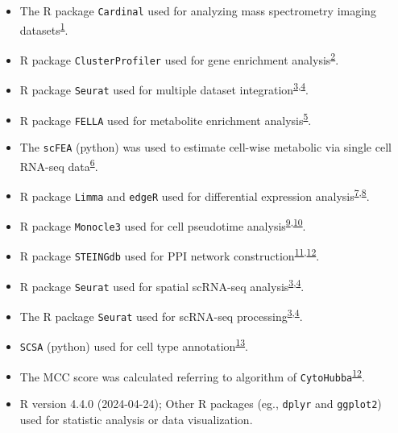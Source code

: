 \documentclass[
]{article}
\providecommand{\tightlist}{%
  \setlength{\itemsep}{0pt}\setlength{\parskip}{0pt}}
\begin{document}
\begin{itemize}
\tightlist
\item
  The R package \texttt{Cardinal} used for analyzing mass spectrometry imaging datasets\textsuperscript{\protect\hyperlink{ref-CardinalV3ABemis2023}{1}}.
\item
  R package \texttt{ClusterProfiler} used for gene enrichment analysis\textsuperscript{\protect\hyperlink{ref-ClusterprofilerWuTi2021}{2}}.
\item
  R package \texttt{Seurat} used for multiple dataset integration\textsuperscript{\protect\hyperlink{ref-IntegratedAnalHaoY2021}{3},\protect\hyperlink{ref-ComprehensiveIStuart2019}{4}}.
\item
  R package \texttt{FELLA} used for metabolite enrichment analysis\textsuperscript{\protect\hyperlink{ref-FellaAnRPacPicart2018}{5}}.
\item
  The \texttt{scFEA} (python) was used to estimate cell-wise metabolic via single cell RNA-seq data\textsuperscript{\protect\hyperlink{ref-AGraphNeuralAlgham2021}{6}}.
\item
  R package \texttt{Limma} and \texttt{edgeR} used for differential expression analysis\textsuperscript{\protect\hyperlink{ref-LimmaPowersDiRitchi2015}{7},\protect\hyperlink{ref-EdgerDifferenChen}{8}}.
\item
  R package \texttt{Monocle3} used for cell pseudotime analysis\textsuperscript{\protect\hyperlink{ref-ReversedGraphQiuX2017}{9},\protect\hyperlink{ref-TheDynamicsAnTrapne2014}{10}}.
\item
  R package \texttt{STEINGdb} used for PPI network construction\textsuperscript{\protect\hyperlink{ref-TheStringDataSzklar2021}{11},\protect\hyperlink{ref-CytohubbaIdenChin2014}{12}}.
\item
  R package \texttt{Seurat} used for spatial scRNA-seq analysis\textsuperscript{\protect\hyperlink{ref-IntegratedAnalHaoY2021}{3},\protect\hyperlink{ref-ComprehensiveIStuart2019}{4}}.
\item
  The R package \texttt{Seurat} used for scRNA-seq processing\textsuperscript{\protect\hyperlink{ref-IntegratedAnalHaoY2021}{3},\protect\hyperlink{ref-ComprehensiveIStuart2019}{4}}.
\item
  \texttt{SCSA} (python) used for cell type annotation\textsuperscript{\protect\hyperlink{ref-ScsaACellTyCaoY2020}{13}}.
\item
  The MCC score was calculated referring to algorithm of \texttt{CytoHubba}\textsuperscript{\protect\hyperlink{ref-CytohubbaIdenChin2014}{12}}.
\item
  R version 4.4.0 (2024-04-24); Other R packages (eg., \texttt{dplyr} and \texttt{ggplot2}) used for statistic analysis or data visualization.
\end{itemize}
\end{document}
